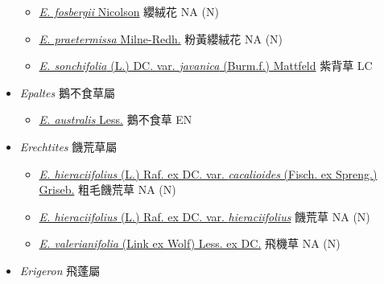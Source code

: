 \begin{itemize}
  \begin{itemize}
        \item[] \href{http://www.theplantlist.org/tpl1.1/search?q=Emilia+fosbergii}{\textit{E. fosbergii} Nicolson}   纓絨花   NA (N)
        \item[] \href{http://www.theplantlist.org/tpl1.1/search?q=Emilia+praetermissa}{\textit{E. praetermissa} Milne-Redh.}   粉黃纓絨花   NA (N)
        \item[] \href{http://www.theplantlist.org/tpl1.1/search?q=Emilia+sonchifolia+var.+javanica}{\textit{E. sonchifolia} (L.) DC. var. \textit{javanica} (Burm.f.) Mattfeld}   紫背草   LC
  \end{itemize}
 \item[] \textit{Epaltes} 鵝不食草屬
                                
  \begin{itemize}
        \item[] \href{http://www.theplantlist.org/tpl1.1/search?q=Epaltes+australis}{\textit{E. australis} Less.}   鵝不食草   EN
  \end{itemize}
 \item[] \textit{Erechtites} 饑荒草屬
                                
  \begin{itemize}
        \item[] \href{http://www.theplantlist.org/tpl1.1/search?q=Erechtites+hieraciifolius+var.+cacalioides}{\textit{E. hieraciifolius} (L.) Raf. ex DC. var. \textit{cacalioides} (Fisch. ex Spreng.) Griseb.}   粗毛饑荒草   NA (N)
        \item[] \href{http://www.theplantlist.org/tpl1.1/search?q=Erechtites+hieraciifolius+var.+hieraciifolius}{\textit{E. hieraciifolius} (L.) Raf. ex DC. var. \textit{hieraciifolius}}   饑荒草   NA (N)
        \item[] \href{http://www.theplantlist.org/tpl1.1/search?q=Erechtites+valerianifolia}{\textit{E. valerianifolia} (Link ex Wolf) Less. ex DC.}   飛機草   NA (N)
  \end{itemize}
 \item[] \textit{Erigeron} 飛蓬屬
                                

\end{itemize}
